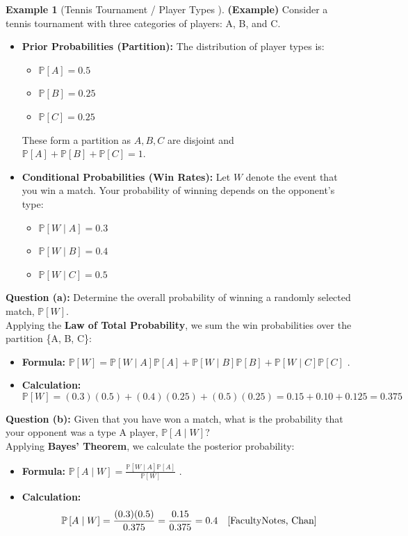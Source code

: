 \documentclass[12pt, a4paper]{article}
\theoremstyle{definition}
\newtheorem{example}{Example}[section] %
\theoremstyle{plain}
\newcommand{\Prob}[1]{\mathbb{P}\left[#1\right]} %
\newcommand{\condProb}[2]{\mathbb{P}\left[#1 \mid #2\right]} %
\begin{document}
\begin{example}[Tennis Tournament / Player Types \cite{FacultyNotes, Chan}]
\textbf{(Example)} Consider a tennis tournament with three categories of players: A, B, and C.
\begin{itemize}
    \item \textbf{Prior Probabilities (Partition):} The distribution of player types is:
        \begin{itemize}
            \item $\Prob{A} = 0.5$
            \item $\Prob{B} = 0.25$
            \item $\Prob{C} = 0.25$
        \end{itemize}
        These form a partition as $A, B, C$ are disjoint and $\Prob{A}+\Prob{B}+\Prob{C} = 1$.
    \item \textbf{Conditional Probabilities (Win Rates):} Let $W$ denote the event that you win a match. Your probability of winning depends on the opponent's type:
        \begin{itemize}
            \item $\condProb{W}{A} = 0.3$
            \item $\condProb{W}{B} = 0.4$
            \item $\condProb{W}{C} = 0.5$
        \end{itemize}
\end{itemize}
\textbf{Question (a):} Determine the overall probability of winning a randomly selected match, $\Prob{W}$.\\
Applying the \textbf{Law of Total Probability}, we sum the win probabilities over the partition \{A, B, C\}:
\begin{itemize}
    \item \textbf{Formula:} $\Prob{W} = \condProb{W}{A}\Prob{A} + \condProb{W}{B}\Prob{B} + \condProb{W}{C}\Prob{C}$ \cite{FacultyNotes, Chan}.
    \item \textbf{Calculation:}
        \[ \Prob{W} = (0.3)(0.5) + (0.4)(0.25) + (0.5)(0.25) = 0.15 + 0.10 + 0.125 = 0.375 \]
\end{itemize}
\textbf{Question (b):} Given that you have won a match, what is the probability that your 
opponent was a type A player, $\condProb{A}{W}$?\\
Applying \textbf{Bayes' Theorem}, we calculate the posterior probability:
\begin{itemize}
    \item \textbf{Formula:} $\condProb{A}{W} = \frac{\condProb{W}{A}\Prob{A}}{\Prob{W}}$ \cite{FacultyNotes, Chan}.
    \item \textbf{Calculation:}
        \[ \condProb{A}{W} = \frac{(0.3)(0.5)}{0.375} = \frac{0.15}{0.375} = 0.4 \quad \cite{FacultyNotes, Chan} \]
\end{itemize}
\end{example}
\end{document}
